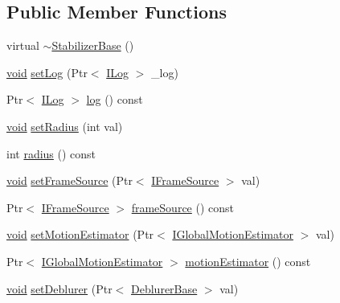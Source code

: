 \subsection*{Public Member Functions}
\begin{DoxyCompactItemize}
\item 
virtual \hyperlink{classcv_1_1videostab_1_1StabilizerBase_a1fe321dcc17dda767cf5a0a75a1d7cba}{$\sim$\-Stabilizer\-Base} ()
\item 
\hyperlink{legacy_8hpp_a8bb47f092d473522721002c86c13b94e}{void} \hyperlink{classcv_1_1videostab_1_1StabilizerBase_ae662221283f1ae15e8472e197bb16a1c}{set\-Log} (Ptr$<$ \hyperlink{classcv_1_1videostab_1_1ILog}{I\-Log} $>$ \-\_\-log)
\item 
Ptr$<$ \hyperlink{classcv_1_1videostab_1_1ILog}{I\-Log} $>$ \hyperlink{classcv_1_1videostab_1_1StabilizerBase_a8fd38fb2bf045c4400551af48931f5aa}{log} () const 
\item 
\hyperlink{legacy_8hpp_a8bb47f092d473522721002c86c13b94e}{void} \hyperlink{classcv_1_1videostab_1_1StabilizerBase_a0245ba9e08329f9ac2f617a8f7c1eaaf}{set\-Radius} (int val)
\item 
int \hyperlink{classcv_1_1videostab_1_1StabilizerBase_a2a817858901dca8f4e25ee18052cd431}{radius} () const 
\item 
\hyperlink{legacy_8hpp_a8bb47f092d473522721002c86c13b94e}{void} \hyperlink{classcv_1_1videostab_1_1StabilizerBase_a107e9f7960b7efd7e210b5e178118021}{set\-Frame\-Source} (Ptr$<$ \hyperlink{classcv_1_1videostab_1_1IFrameSource}{I\-Frame\-Source} $>$ val)
\item 
Ptr$<$ \hyperlink{classcv_1_1videostab_1_1IFrameSource}{I\-Frame\-Source} $>$ \hyperlink{classcv_1_1videostab_1_1StabilizerBase_ab737922d7837b8b0f17b62b22f7080d7}{frame\-Source} () const 
\item 
\hyperlink{legacy_8hpp_a8bb47f092d473522721002c86c13b94e}{void} \hyperlink{classcv_1_1videostab_1_1StabilizerBase_aee3d7453c411866b4143033122d9a24f}{set\-Motion\-Estimator} (Ptr$<$ \hyperlink{classcv_1_1videostab_1_1IGlobalMotionEstimator}{I\-Global\-Motion\-Estimator} $>$ val)
\item 
Ptr$<$ \hyperlink{classcv_1_1videostab_1_1IGlobalMotionEstimator}{I\-Global\-Motion\-Estimator} $>$ \hyperlink{classcv_1_1videostab_1_1StabilizerBase_a5b78518768c6a823a8717589673db907}{motion\-Estimator} () const 
\item 
\hyperlink{legacy_8hpp_a8bb47f092d473522721002c86c13b94e}{void} \hyperlink{classcv_1_1videostab_1_1StabilizerBase_a45319b46a3729c36cda4f664da2a69b1}{set\-Deblurer} (Ptr$<$ \hyperlink{classcv_1_1videostab_1_1DeblurerBase}{Deblurer\-Base} $>$ val)

\end{DoxyCompactItemize}
